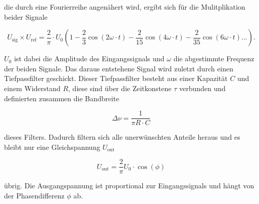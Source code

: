die durch eine Fourierreihe angenähert wird, ergibt sich für die Mulitplikation beider Signale 

\begin{equation}
    U_\text{sig} \times U_\text{ref} = \frac{2}{\pi} \cdot U_0 \left(1 - \frac{2}{3}\cos{\left(2\omega \cdot t\right)}  -  \frac{2}{15}\cos{\left(4\omega \cdot t\right)} - \frac{2}{35}\cos{\left(6\omega \cdot t\right)}...\right).
    \label{eq:u_ref_sig}
\end{equation}

$U_0$ ist dabei die Amplitude des Eingangssignals und $\omega$ die abgestimmte Frequenz der beiden Signale.
Das daraus entstehene Signal wird zuletzt durch einen Tiefpassfilter geschickt.
Dieser Tiefpassfilter besteht aus einer Kapazität $C$ und einem Widerstand $R$, diese sind über die Zeitkonstene $\tau$ verbunden und definierten zusammen die Bandbreite

\begin{equation}
    \Delta \nu = \frac{1}{\pi R \cdot C}
    \label{eq:tau}
\end{equation}

dieses Filters.
Dadurch filtern sich alle unerwünschten Anteile heraus und es bleibt nur eine Gleichspannung $U_\text{out}$ 

\begin{equation}
    U_\text{out} = \frac{2}{\pi} U_0 \cdot \cos{\left(\phi\right)}
    \label{eq:u_out}
\end{equation}

übrig.
Die Ausgangspannung ist proportional zur Eingangssignals und hängt von der Phasendifferenz $\phi$ ab. 
